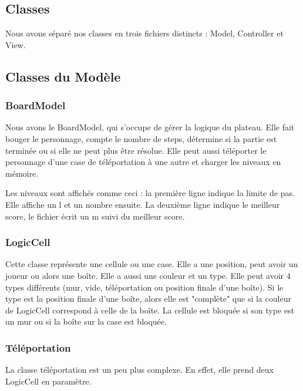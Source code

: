 \documentclass[utf8]{article}
\begin{document}
\begin{large}
\par


\section{Classes}
\indent
\par
Nous avons séparé nos classes en trois fichiers distincts : Model, Controller et View.
\par
\subsection{Classes du Modèle}

\subsubsection{BoardModel}
\indent
\par
Nous avons le BoardModel, qui s'occupe de gérer la logique du plateau. Elle fait
bouger le personnage, compte le nombre de steps, détermine si la partie est
terminée ou si elle ne peut plus être résolue. Elle peut aussi téléporter le
personnage d'une case de téléportation à une autre et charger les niveaux en
mémoire.
\par
Les niveaux sont affichés comme ceci : la première ligne indique la limite de
pas. Elle affiche un l et un nombre ensuite. La deuxième ligne indique le
meilleur score, le fichier écrit un m suivi du meilleur score.
\par

\subsubsection{LogicCell}
\indent
\par
Cette classe représente une cellule ou une case. Elle a une position, peut avoir
un joueur ou alors une boîte. Elle a aussi une couleur et un type. Elle peut
avoir 4 types différents (mur, vide, téléportation ou position finale d'une
boîte). Si le type est la position finale d'une boîte, alors elle est "complète"
que si la couleur de LogicCell correspond à celle de la boîte. La cellule est
bloquée si son type est un mur ou si la boîte sur la case est bloquée.
\par
\subsubsection{Téléportation}
\indent
\par
La classe téléportation est un peu plus complexe. En effet, elle prend deux
LogicCell en paramètre. 
\par

\end{large}
\end{document}
